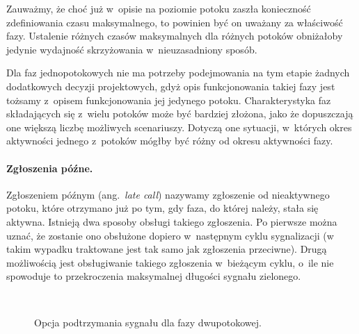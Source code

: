 \documentclass{pracamgr}
\newcommand{\ang}[1]{(ang.~\emph{#1})}
\theoremstyle{plain}
\begin{document}
Zauważmy, że choć już w~opisie na poziomie potoku zaszła konieczność
zdefiniowania czasu maksymalnego, to powinien być on uważany za
właściwość fazy. Ustalenie różnych czasów maksymalnych dla różnych
potoków obniżałoby jedynie wydajność skrzyżowania w~nieuzasadniony
sposób.

Dla faz jednopotokowych nie ma potrzeby podejmowania na tym etapie
żadnych dodatkowych decyzji projektowych, gdyż opis funkcjonowania
takiej fazy jest tożsamy z~opisem funkcjonowania jej jedynego
potoku. Charakterystyka faz składających się z~wielu potoków może być
bardziej złożona, jako że dopuszczają one większą liczbę możliwych
scenariuszy. Dotyczą one sytuacji, w~których okres aktywności jednego
z~potoków mógłby być różny od okresu aktywności fazy.

\paragraph{Zgłoszenia późne.} Zgłoszeniem późnym \ang{late call} nazywamy zgłoszenie od
nieaktywnego potoku, które otrzymano już po tym, gdy faza, do której
należy, stała się aktywna. Istnieją dwa sposoby obsługi takiego
zgłoszenia. Po pierwsze można uznać, że zostanie ono obsłużone dopiero
w~następnym cyklu sygnalizacji (w takim wypadku traktowane jest tak
samo jak zgłoszenia przeciwne). Drugą możliwością jest obsługiwanie
takiego zgłoszenia w~bieżącym cyklu, o~ile nie spowoduje to
przekroczenia maksymalnej długości sygnału zielonego.
\begin{figure}
  \centering
  \\\vspace{0.5cm}
  \caption{Opcja podtrzymania sygnału dla fazy dwupotokowej.}
\end{figure}
\end{document}
